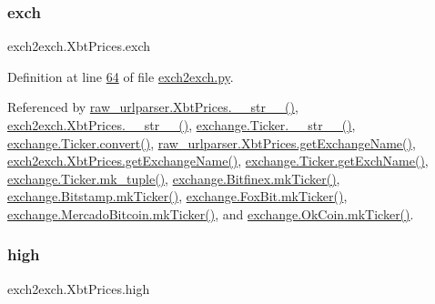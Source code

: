 \mbox{\label{classexch2exch_1_1_xbt_prices_a72caf3a29017a1ceaf4367240a46b360}} 
\subsubsection{\texorpdfstring{exch}{exch}}
{\footnotesize\ttfamily exch2exch.\+Xbt\+Prices.\+exch}



Definition at line \hyperlink{exch2exch_8py_source_l00064}{64} of file \hyperlink{exch2exch_8py_source}{exch2exch.\+py}.



Referenced by \hyperlink{raw__urlparser_8py_source_l00074}{raw\+\_\+urlparser.\+Xbt\+Prices.\+\_\+\+\_\+str\+\_\+\+\_\+()}, \hyperlink{exch2exch_8py_source_l00091}{exch2exch.\+Xbt\+Prices.\+\_\+\+\_\+str\+\_\+\+\_\+()}, \hyperlink{exchange_8py_source_l00136}{exchange.\+Ticker.\+\_\+\+\_\+str\+\_\+\+\_\+()}, \hyperlink{exchange_8py_source_l00069}{exchange.\+Ticker.\+convert()}, \hyperlink{raw__urlparser_8py_source_l00068}{raw\+\_\+urlparser.\+Xbt\+Prices.\+get\+Exchange\+Name()}, \hyperlink{exch2exch_8py_source_l00085}{exch2exch.\+Xbt\+Prices.\+get\+Exchange\+Name()}, \hyperlink{exchange_8py_source_l00091}{exchange.\+Ticker.\+get\+Exch\+Name()}, \hyperlink{exchange_8py_source_l00121}{exchange.\+Ticker.\+mk\+\_\+tuple()}, \hyperlink{exchange_8py_source_l00453}{exchange.\+Bitfinex.\+mk\+Ticker()}, \hyperlink{exchange_8py_source_l00525}{exchange.\+Bitstamp.\+mk\+Ticker()}, \hyperlink{exchange_8py_source_l00584}{exchange.\+Fox\+Bit.\+mk\+Ticker()}, \hyperlink{exchange_8py_source_l00665}{exchange.\+Mercado\+Bitcoin.\+mk\+Ticker()}, and \hyperlink{exchange_8py_source_l00730}{exchange.\+Ok\+Coin.\+mk\+Ticker()}.

\mbox{\label{classexch2exch_1_1_xbt_prices_aeae6235417d65d9e9c768a51c38d5388}} 
\subsubsection{\texorpdfstring{high}{high}}
{\footnotesize\ttfamily exch2exch.\+Xbt\+Prices.\+high}



